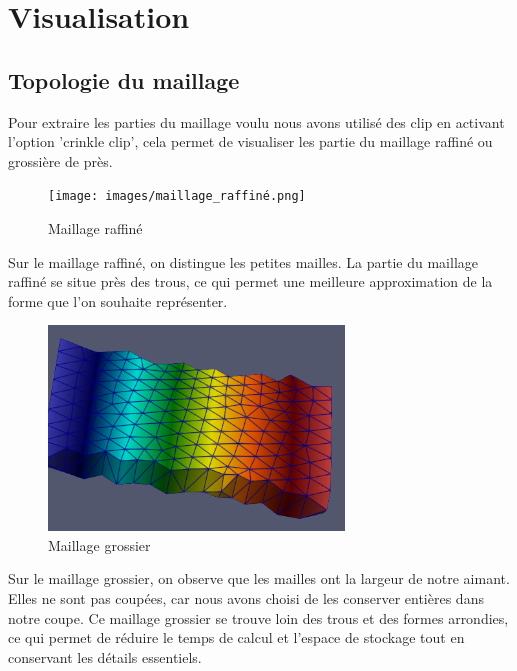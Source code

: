 \usepackage{graphicx}
\usepackage{caption}



\section{Visualisation}

\subsection{Topologie du maillage}

Pour extraire les parties du maillage voulu nous avons utilisé des clip en activant l'option 'crinkle clip', 
cela permet de visualiser les partie du maillage raffiné ou grossière de près.

\begin{figure}[h]
    \centering
    \texttt{[image: images/maillage\_raffiné.png]}
    \caption{Maillage raffiné}
\end{figure}
Sur le maillage raffiné, on distingue les petites mailles. 
La partie du maillage raffiné se situe près des trous, 
ce qui permet une meilleure approximation de la forme que l'on souhaite représenter.
\begin{figure}[h]
    \centering
    \includegraphics[width=0.7\textwidth]{images/maillage_grossier.png}
    \caption{Maillage grossier}
\end{figure}

Sur le maillage grossier, on observe que les mailles ont la largeur de notre aimant. 
Elles ne sont pas coupées, car nous avons choisi de les conserver entières dans notre coupe. 
Ce maillage grossier se trouve loin des trous et des formes arrondies, 
ce qui permet de réduire le temps de calcul et l’espace de stockage tout en conservant les détails essentiels.

